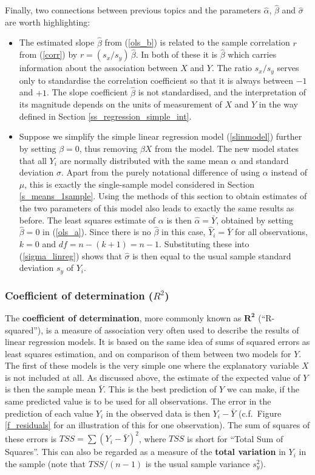 Finally, two connections between previous topics and the parameters
$\hat{\alpha}$, $\hat{\beta}$ and $\hat{\sigma}$
are worth highlighting:
\begin{itemize}
\item
The estimated slope $\hat{\beta}$ from (\ref{ols_b}) is related to the sample
correlation $r$ from (\ref{corr}) by $r=(s_{x}/s_{y})\,\hat{\beta}$. In both
of these it is $\hat{\beta}$ which carries information about the
association between $X$ and $Y$. The ratio $s_{x}/s_{y}$ serves only to
standardise the correlation coefficient so that it is always between
$-1$
and $+1$. The slope coefficient $\hat{\beta}$ is not standardised, and the
interpretation of its magnitude depends on the units of measurement of
$X$ and $Y$ in the way defined in Section
\ref{ss_regression_simple_int}.
\item
Suppose we simplify the simple linear regression model (\ref{slinmodel})
further by setting $\beta=0$, thus removing $\beta X$ from the model. The
new model states that all $Y_{i}$ are normally distributed with the
same mean $\alpha$ and standard deviation $\sigma$. Apart from the
purely notational difference of using $\alpha$ instead of $\mu$, this is
exactly the single-sample model considered in Section
\ref{s_means_1sample}.
Using the methods of this section to obtain estimates of the two
parameters of this model also leads to exactly the same results
as before. The least squares estimate of $\alpha$ is then
$\hat{\alpha}=\bar{Y}$, obtained by setting $\hat{\beta}=0$ in
(\ref{ols_a}). Since there is no $\hat{\beta}$ in this case,
$\hat{Y}_{i}=\bar{Y}$ for all observations, $k=0$ and $df=n-(k+1)=n-1$.
Substituting these into (\ref{sigma_linreg}) shows that $\hat{\sigma}$
is then equal to the usual sample standard deviation $s_{y}$ of $Y_{i}$.
\end{itemize}

\subsubsection{Coefficient of determination ($R^{2}$)}

\label{p_R2}The \textbf{coefficient of determination}, more commonly
known as $\mathbf{R^{2}}$ (``R-squared''), is a measure of association
very often used to describe the results of linear regression models. It
is based on the same idea of sums of squared errors as least squares
estimation, and on comparison of them between two models for $Y$.
The first of these models is the very simple one where the explanatory
variable $X$ is not included at all. As discussed above, the estimate of
the expected value of $Y$ is then the sample mean $\bar{Y}$. This is the best
prediction of $Y$ we can make, if the same predicted value is to be used for
all observations. The error in the prediction of
each value $Y_{i}$ in the observed data is then $Y_{i}-\bar{Y}$ (c.f.\ Figure
\ref{f_residuals} for an illustration of this for one observation). The
sum of squares of these errors is $TSS=\sum (Y_{i}-\bar{Y})^{2}$, where
$TSS$ is short for ``Total Sum of Squares''. This can also be regarded as
a measure of the \textbf{total variation} in $Y_{i}$ in the sample (note that
$TSS/(n-1)$ is the usual sample variance $s^{2}_{y}$).

